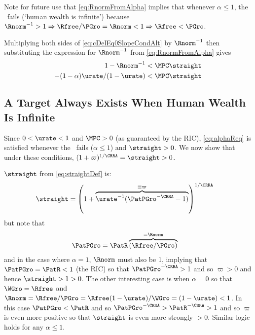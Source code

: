 \documentclass{handout}
\begin{document}
Note for future use that \eqref{eq:RnormFromAlpha} implies that whenever $\alpha \leq 1$, the \FHWCPGro~fails (`human wealth is infinite') because $\Rnorm^{-1} > 1 \Rightarrow \Rfree/\PGro = \Rnorm < 1 \Rightarrow \Rfree < \PGro$.  

Multiplying both sides of \eqref{eq:cDelEq0SlopeCondAlt} by $\Rnorm^{-1}$ then substituting the expression for $\Rnorm^{-1}$ from \eqref{eq:RnormFromAlpha} gives
\begin{equation}\begin{gathered}\begin{aligned}
  1- \Rnorm^{-1} & <  \MPCU \straight
\\ - (1-\alpha)\urate/(1-\urate) & <  \MPCU \straight \label{eq:alphaReq}
\end{aligned}\end{gathered}\end{equation}

\subsection{A Target Always Exists When Human Wealth Is Infinite}

Since $0 < \urate < 1$ and $\MPCU>0$ (as guaranteed by the RIC), \eqref{eq:alphaReq} is satisfied whenever the \FHWCPGro~fails ($\alpha \leq 1$) and $\straight > 0$.
We now show that under these conditions, $(1+\varpi)^{1/\CRRA}=\straight>0$.  

$\straight$ from \eqref{eq:straightDef} is:
\begin{equation}\begin{gathered}\begin{aligned}
  \straight & =  \left(1+\overbrace{\urate^{-1}(\PatPGro^{-\CRRA}-1)}^{\equiv \varpi}\right)^{1/\CRRA}
\end{aligned}\end{gathered}\end{equation}
but note that 
\begin{equation}\begin{gathered}\begin{aligned}
  \PatPGro & =  \PatR \overbrace{(\Rfree/\PGro)}^{=\Rnorm}
\end{aligned}\end{gathered}\end{equation}
and in the case where $\alpha=1$, $\Rnorm$ must also be 1, implying that $\PatPGro = \PatR < 1$ (the RIC) so that $\PatPGro^{-\CRRA} > 1$ and so $\varpi > 0$ and hence $\straight > 1 > 0$.  The other interesting case is when $\alpha=0$ so that $\WGro=\Rfree$ and $\Rnorm=\Rfree/\PGro=\Rfree(1-\urate)/\WGro=(1-\urate)<1$.  In this case $\PatPGro < \PatR$ and so $\PatPGro^{-\CRRA} > \PatR^{-\CRRA} > 1$ and so $\varpi$ is even more positive so that $\straight$ is even more strongly $>0$.  Similar logic holds for any $\alpha \leq 1$.  
\end{document}
